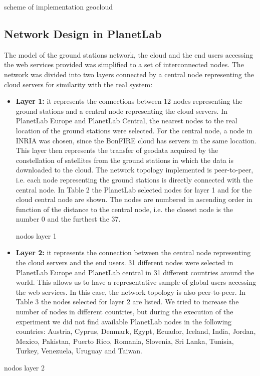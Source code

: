 scheme of implementation geocloud


\subsection{Network Design in PlanetLab}

The model of the ground stations network, the cloud and the end users accessing
the web services provided was simplified to a set of interconnected nodes. The
network was divided into two layers connected by a central node representing the
cloud servers for similarity with the real system: 
\begin{itemize}

\item \textbf{Layer 1:} it represents the connections between 12 nodes
  representing the ground stations and a central node representing the cloud
  servers. In PlanetLab Europe and PlanetLab Central, the nearest nodes to the
  real location of the ground stations were selected. For the central node, a
  node in INRIA was chosen, since the BonFIRE cloud has servers in the same
  location. This layer then represents the transfer of geodata acquired by the
  constellation of satellites from the ground stations in which the data is
  downloaded to the cloud. The network topology implemented is peer-to-peer,
  i.e. each node representing the ground stations is directly connected with the
  central node. In Table 2 the PlanetLab selected nodes for layer 1 and for the
  cloud central node are shown. The nodes are numbered in ascending order in
  function of the distance to the central node, i.e. the closest node is the
  number 0 and the furthest the 37. 

nodos layer 1


\item \textbf{Layer 2:} it represents the connection between the central node representing the cloud servers and the end users. 31 different nodes were selected in PlanetLab Europe and PlanetLab central in 31 different countries around the world. This allows us to have a representative sample of global users accessing the web services. In this case, the network topology is also peer-to-peer. In Table 3 the nodes selected for layer 2 are listed. We tried to increase the number of nodes in different countries, but during the execution of the experiment we did not find available PlanetLab nodes in the following countries: Austria, Cyprus, Denmark, Egypt, Ecuador, Iceland, India, Jordan, Mexico, Pakistan, Puerto Rico, Romania, Slovenia, Sri Lanka, Tunisia, Turkey, Venezuela, Uruguay and Taiwan. 
\end{itemize}
nodos layer 2


